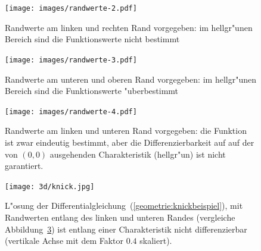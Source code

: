\begin{figure}
\begin{center}
\texttt{[image: images/randwerte-2.pdf]}
\end{center}
\caption{Randwerte am linken und rechten Rand vorgegeben: im hellgr"unen
Bereich sind die Funktionswerte nicht bestimmt \label{geometrie:charrand1}}
\end{figure}

\begin{figure}
\begin{center}
\texttt{[image: images/randwerte-3.pdf]}
\end{center}
\caption{Randwerte am unteren und oberen Rand vorgegeben: im hellgr"unen
Bereich sind die Funktionswerte "uberbestimmt \label{geometrie:charrand2}}
\end{figure}

\begin{figure}
\begin{center}
\texttt{[image: images/randwerte-4.pdf]}
\end{center}
\caption{Randwerte am linken und unteren Rand vorgegeben: die Funktion
ist zwar eindeutig bestimmt, aber die Differenzierbarkeit auf auf
der von $(0,0)$ ausgehenden Charakteristik (hellgr"un) ist nicht garantiert.
\label{geometrie:charrand3}}
\end{figure}

\begin{figure}
\centering
\texttt{[image: 3d/knick.jpg]}
\caption{L"osung der Differentialgleichung~(\ref{geometrie:knickbeispiel}),
mit Randwerten entlang des linken und unteren Randes (vergleiche
Abbildung~\ref{geometrie:charrand3}) ist entlang einer Charakteristik
nicht differenzierbar (vertikale Achse mit dem Faktor $0.4$ skaliert).
\label{geometrie:knick}}
\end{figure}

